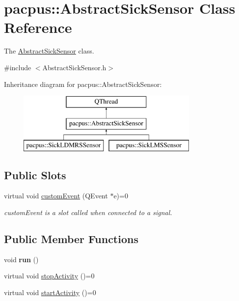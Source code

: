 \hypertarget{classpacpus_1_1AbstractSickSensor}{\section{pacpus\-:\-:Abstract\-Sick\-Sensor Class Reference}
\label{classpacpus_1_1AbstractSickSensor}
}


The \hyperlink{classpacpus_1_1AbstractSickSensor}{Abstract\-Sick\-Sensor} class.  




{\ttfamily \#include $<$Abstract\-Sick\-Sensor.\-h$>$}

Inheritance diagram for pacpus\-:\-:Abstract\-Sick\-Sensor\-:\begin{figure}[H]
\begin{center}
\leavevmode
\includegraphics[height=3.000000cm]{classpacpus_1_1AbstractSickSensor}
\end{center}
\end{figure}
\subsection*{Public Slots}
\begin{DoxyCompactItemize}
\item 
virtual void \hyperlink{classpacpus_1_1AbstractSickSensor_a566931db0cd4e37110d60f3a25eb8de6}{custom\-Event} (Q\-Event $\ast$e)=0
\begin{DoxyCompactList}\small\item\em custom\-Event is a slot called when connected to a signal. \end{DoxyCompactList}\end{DoxyCompactItemize}
\subsection*{Public Member Functions}
\begin{DoxyCompactItemize}
\item 
\hypertarget{classpacpus_1_1AbstractSickSensor_ae0577b049c0ad3dd79f1d56bcc9f3fe2}{void {\bfseries run} ()}\label{classpacpus_1_1AbstractSickSensor_ae0577b049c0ad3dd79f1d56bcc9f3fe2}

\item 
virtual void \hyperlink{classpacpus_1_1AbstractSickSensor_a14c6da8df61d91f2b63439df00fd5d6a}{stop\-Activity} ()=0
\item 
virtual void \hyperlink{classpacpus_1_1AbstractSickSensor_af8e017866cf70db766dbd11b60a52425}{start\-Activity} ()=0
\end{DoxyCompactItemize}
